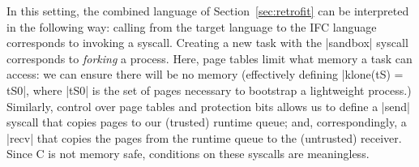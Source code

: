 In this setting, the combined language of Section~\ref{sec:retrofit}
can be interpreted in the following way: calling from the target
language to the IFC language corresponds to invoking a syscall.
%
Creating a new task with the |sandbox| syscall corresponds to
\emph{forking} a process.  Here, page tables limit what memory
a task can access: we can ensure there will be no memory (effectively
defining |klone(tS)
= tS0|, where |tS0| is the set of pages necessary to bootstrap a
lightweight process.)
%
Similarly, control over page tables and protection bits allows us to
define a |send| syscall that copies pages to our
(trusted) runtime queue; and, correspondingly, a |recv| that copies
the pages from the runtime queue to the (untrusted) receiver.
%
Since C is not memory safe, conditions on these syscalls are
meaningless.
